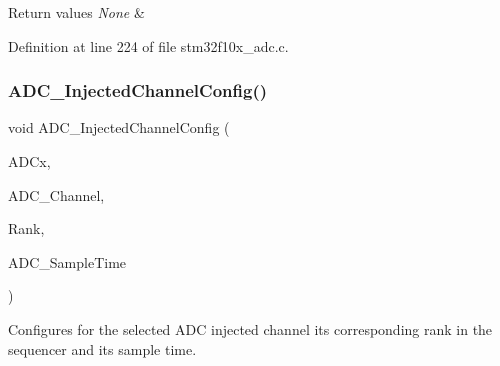\begin{DoxyRetVals}{Return values}
{\em None} & \\
\hline
\end{DoxyRetVals}


Definition at line 224 of file stm32f10x\+\_\+adc.\+c.

\mbox{\label{group___a_d_c___private___functions_gae2b44bff080184e1cf6f2cb6b9bb3e59}} 
\subsubsection{\texorpdfstring{A\+D\+C\+\_\+\+Injected\+Channel\+Config()}{ADC\_InjectedChannelConfig()}}
{\footnotesize\ttfamily void A\+D\+C\+\_\+\+Injected\+Channel\+Config (\begin{DoxyParamCaption}\item[{\hyperlink{struct_a_d_c___type_def}{A\+D\+C\+\_\+\+Type\+Def} $\ast$}]{A\+D\+Cx,  }\item[{uint8\+\_\+t}]{A\+D\+C\+\_\+\+Channel,  }\item[{uint8\+\_\+t}]{Rank,  }\item[{uint8\+\_\+t}]{A\+D\+C\+\_\+\+Sample\+Time }\end{DoxyParamCaption})}



Configures for the selected A\+DC injected channel its corresponding rank in the sequencer and its sample time. 


